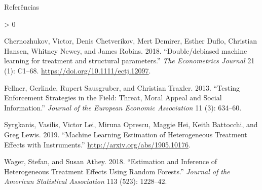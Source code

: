 \documentclass[
  12pt,
  ignorenonframetext,
  aspectratio=169]{beamer}
\newlength{\cslhangindent}
\newenvironment{CSLReferences}[2] %
 {%
  \setlength{\parindent}{0pt}
  \ifodd #1 \everypar{\setlength{\hangindent}{\cslhangindent}}\ignorespaces\fi
  \ifnum #2 > 0
  \setlength{\parskip}{#2\baselineskip}
  \fi
 }%
 {}
\begin{document}
\begin{frame}[allowframebreaks]{Referências}
\protect\hypertarget{referuxeancias}{}
\scriptsize

\hypertarget{refs}{}
\begin{CSLReferences}{1}{0}
\leavevmode\hypertarget{ref-Chernozhukov2018}{}%
Chernozhukov, Victor, Denis Chetverikov, Mert Demirer, Esther Duflo,
Christian Hansen, Whitney Newey, and James Robins. 2018.
{``{Double/debiased machine learning for treatment and structural
parameters}.''} \emph{The Econometrics Journal} 21 (1): C1--68.
\url{https://doi.org/10.1111/ectj.12097}.

\leavevmode\hypertarget{ref-Fellner2013}{}%
Fellner, Gerlinde, Rupert Sausgruber, and Christian Traxler. 2013.
{``Testing Enforcement Strategies in the Field: Threat, Moral Appeal and
Social Information.''} \emph{Journal of the European Economic
Association} 11 (3): 634--60.

\leavevmode\hypertarget{ref-Syrgkanis2019}{}%
Syrgkanis, Vasilis, Victor Lei, Miruna Oprescu, Maggie Hei, Keith
Battocchi, and Greg Lewis. 2019. {``Machine Learning Estimation of
Heterogeneous Treatment Effects with Instruments.''}
\url{http://arxiv.org/abs/1905.10176}.

\leavevmode\hypertarget{ref-Wager2018}{}%
Wager, Stefan, and Susan Athey. 2018. {``Estimation and Inference of
Heterogeneous Treatment Effects Using Random Forests.''} \emph{Journal
of the American Statistical Association} 113 (523): 1228--42.

\end{CSLReferences}
\end{frame}
\end{document}
